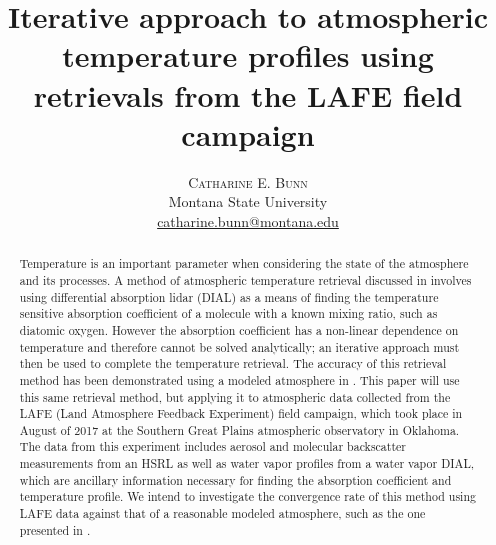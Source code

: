 \documentclass[twoside]{article}
\title{\vspace{-15mm}\fontsize{22pt}{10pt}\selectfont\textbf{Iterative approach to atmospheric temperature profiles using retrievals from the LAFE field campaign}} %
\author{
\large
\textsc{Catharine E. Bunn}\\[2mm] %
\normalsize Montana State University \\ %
\normalsize \href{mailto:catharine.bunn@montana.edu}{catharine.bunn@montana.edu} %
\vspace{-5mm}
}
\date{}
\begin{document}
\maketitle %

\thispagestyle{fancy} %




\begin{abstract}
\noindent Temperature is an important parameter when considering the state of the atmosphere and its processes. 
A method of atmospheric temperature retrieval discussed in \citet{Bosenberg1998} involves using differential absorption lidar (DIAL) as a means of finding the temperature sensitive absorption coefficient of a molecule with a known mixing ratio, such as diatomic oxygen. 
However the absorption coefficient has a non-linear dependence on temperature and therefore cannot be solved analytically; an iterative approach must then be used to complete the temperature retrieval.
 The accuracy of this retrieval method has been demonstrated using a modeled atmosphere in \citet{Bunn2018}. 
 This paper will use this same retrieval method, but applying it to atmospheric data collected from the LAFE (Land Atmosphere Feedback Experiment) field campaign, which took place in August of 2017 at the Southern Great Plains atmospheric observatory in Oklahoma. 
 The data from this experiment includes aerosol and molecular backscatter measurements from an HSRL as well as water vapor profiles from a water vapor DIAL, which are ancillary information necessary for finding the absorption coefficient and temperature profile.
 We intend to investigate the convergence rate of this method using LAFE data against that of a reasonable modeled atmosphere, such as the one presented in \citet{Bunn2018}.
\end{abstract}
\end{document}
